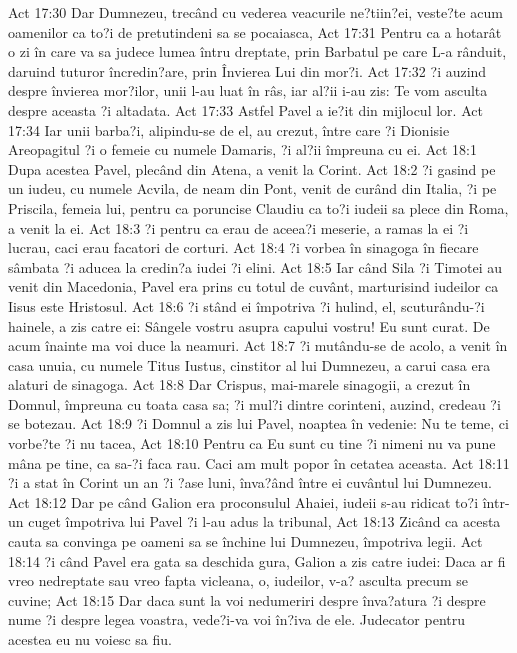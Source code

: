 Act 17:30  Dar Dumnezeu, trecând cu vederea veacurile ne?tiin?ei, veste?te acum oamenilor ca to?i de pretutindeni sa se pocaiasca,
Act 17:31  Pentru ca a hotarât o zi în care va sa judece lumea întru dreptate, prin Barbatul pe care L-a rânduit, daruind tuturor încredin?are, prin Învierea Lui din mor?i.
Act 17:32  ?i auzind despre învierea mor?ilor, unii l-au luat în râs, iar al?ii i-au zis: Te vom asculta despre aceasta ?i altadata.
Act 17:33  Astfel Pavel a ie?it din mijlocul lor.
Act 17:34  Iar unii barba?i, alipindu-se de el, au crezut, între care ?i Dionisie Areopagitul ?i o femeie cu numele Damaris, ?i al?ii împreuna cu ei.
Act 18:1  Dupa acestea Pavel, plecând din Atena, a venit la Corint.
Act 18:2  ?i gasind pe un iudeu, cu numele Acvila, de neam din Pont, venit de curând din Italia, ?i pe Priscila, femeia lui, pentru ca poruncise Claudiu ca to?i iudeii sa plece din Roma, a venit la ei.
Act 18:3  ?i pentru ca erau de aceea?i meserie, a ramas la ei ?i lucrau, caci erau facatori de corturi.
Act 18:4  ?i vorbea în sinagoga în fiecare sâmbata ?i aducea la credin?a iudei ?i elini.
Act 18:5  Iar când Sila ?i Timotei au venit din Macedonia, Pavel era prins cu totul de cuvânt, marturisind iudeilor ca Iisus este Hristosul.
Act 18:6  ?i stând ei împotriva ?i hulind, el, scuturându-?i hainele, a zis catre ei: Sângele vostru asupra capului vostru! Eu sunt curat. De acum înainte ma voi duce la neamuri.
Act 18:7  ?i mutându-se de acolo, a venit în casa unuia, cu numele Titus Iustus, cinstitor al lui Dumnezeu, a carui casa era alaturi de sinagoga.
Act 18:8  Dar Crispus, mai-marele sinagogii, a crezut în Domnul, împreuna cu toata casa sa; ?i mul?i dintre corinteni, auzind, credeau ?i se botezau.
Act 18:9  ?i Domnul a zis lui Pavel, noaptea în vedenie: Nu te teme, ci vorbe?te ?i nu tacea,
Act 18:10  Pentru ca Eu sunt cu tine ?i nimeni nu va pune mâna pe tine, ca sa-?i faca rau. Caci am mult popor în cetatea aceasta.
Act 18:11  ?i a stat în Corint un an ?i ?ase luni, înva?ând între ei cuvântul lui Dumnezeu.
Act 18:12  Dar pe când Galion era proconsulul Ahaiei, iudeii s-au ridicat to?i într-un cuget împotriva lui Pavel ?i l-au adus la tribunal,
Act 18:13  Zicând ca acesta cauta sa convinga pe oameni sa se închine lui Dumnezeu, împotriva legii.
Act 18:14  ?i când Pavel era gata sa deschida gura, Galion a zis catre iudei: Daca ar fi vreo nedreptate sau vreo fapta vicleana, o, iudeilor, v-a? asculta precum se cuvine;
Act 18:15  Dar daca sunt la voi nedumeriri despre înva?atura ?i despre nume ?i despre legea voastra, vede?i-va voi în?iva de ele. Judecator pentru acestea eu nu voiesc sa fiu.
